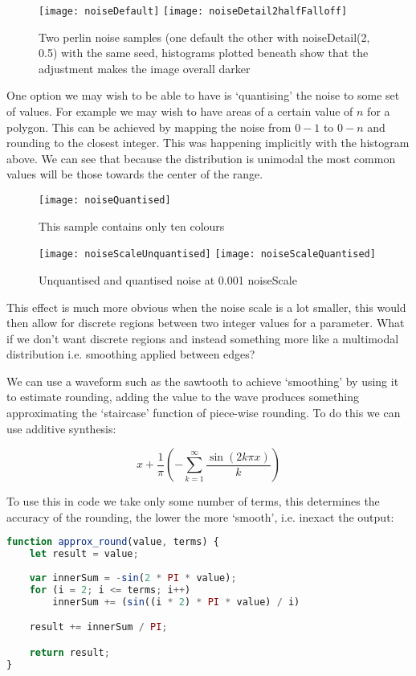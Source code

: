 \begin{figure}[H]
\centering
\texttt{[image: noiseDefault]}
\hspace{0.2cm}
\texttt{[image: noiseDetail2halfFalloff]}
\caption{Two perlin noise samples (one default the other with
noiseDetail(2, 0.5) with the same seed, histograms plotted beneath show
that the adjustment makes the image overall darker}
\end{figure}

One option we may wish to be able to have is `quantising' the noise to some set
of values. For example we may wish to have areas of a certain value of $n$ for a
polygon. This can be achieved by mapping the noise from $0-1$ to $0-n$ and
rounding to the closest integer. This was happening implicitly with the
histogram above. We can see that because the distribution is unimodal the most
common values will be those towards the center of the range.

\begin{figure}[H]
\centering
\texttt{[image: noiseQuantised]}
\caption{This sample contains only ten colours}
\end{figure}

\begin{figure}[H]
\centering
\texttt{[image: noiseScaleUnquantised]}
\hspace{0.2cm}
\texttt{[image: noiseScaleQuantised]}
\caption{Unquantised and quantised noise at 0.001 noiseScale}
\label{0.001scale}
\end{figure}

This effect is much more obvious when the noise scale is a lot smaller, this
would then allow for discrete regions between two integer values for a
parameter. What if we don't want discrete regions and instead something more
like a multimodal distribution i.e. smoothing applied between edges?

We can use a waveform such as the sawtooth to achieve `smoothing' by using it to
estimate rounding, adding the value to the wave produces something approximating
the `staircase' function of piece-wise rounding. To do this we can use additive
synthesis:

$$x + \frac{1}{\pi} (-\sum^\infty_{k=1} \frac{\sin(2k \pi x)}{k})$$

To use this in code we take only some number of terms, this determines the
accuracy of the rounding, the lower the more `smooth', i.e. inexact the output:
\begin{lstlisting}[language=JavaScript]
function approx_round(value, terms) {
    let result = value;
    
    var innerSum = -sin(2 * PI * value);
    for (i = 2; i <= terms; i++)
        innerSum += (sin((i * 2) * PI * value) / i)

    result += innerSum / PI;

    return result;
}
\end{lstlisting}

